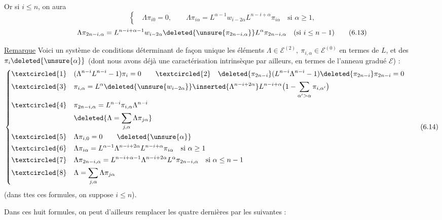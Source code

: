 Or si $i\leq n$, on aura
\[
\left\{\quad\Lambda\pi_{i0}=0,\qquad\Lambda\pi_{i\alpha}=L^{\alpha-1}w_{i-2\alpha}L^{n-i+\alpha}\pi_{i\alpha}\quad\text{si }\alpha\geq1,\right.
\tag{6.12}
\]
\[
\Lambda\pi_{2n-i,\alpha}=L^{n-i+\alpha-1}w_{i-2\alpha}\deleted{\unsure{\pi_{2n-i,\alpha}}}L^\alpha\pi_{2n-i,\alpha}\quad(\text{si }i\leq n-1)
\tag{6.13}
\]

\uline{Remarque} Voici un système de conditions déterminant de façon unique les éléments $\Lambda\in\mathcal E^{(2)},\ \pi_{i,\alpha}\in\mathcal E^{(0)}$ en termes de $L$, et des $\pi_i\deleted{\unsure{\alpha}}$ (dont nous avons déjà une caractérisation intrinsèque par ailleurs, en termes de l'anneau gradué $\mathcal E$) :
\[
\left\{\begin{aligned}
\textcircled{1}\quad &(\Lambda^{n-i}L^{n-i}-1)\pi_i=0
\qquad\textcircled{2}\quad\deleted{\pi_{2n-i}}(L^{n-i}\Lambda^{n-i}-1)\deleted{\pi_{2n-i}}\pi_{2n-i}=0\\
\textcircled{3}\quad &\pi_{i,\alpha}=L^\alpha\deleted{\unsure{w_{i-2\alpha}}}\inserted{\Lambda^{n-i+2\alpha}}L^{n-i+\alpha}\bigl(1-\sum_{\alpha'>\alpha}\pi_{i,\alpha'}\bigr)\\
\textcircled{4}\quad &\pi_{2n-i,\alpha}=L^{n-i}\pi_{i,\alpha}\Lambda^{n-i}\\
&\deleted{\Lambda=\sum_{j,\alpha}\Lambda\pi_{j\alpha}}\\
\textcircled{5}\quad &\Lambda\pi_{i,0}=0\qquad\deleted{\unsure{\alpha}}\\
\textcircled{6}\quad &\Lambda\pi_{i\alpha}=L^{\alpha-1}\Lambda^{n-i+2\alpha}L^{n-i+\alpha}\pi_{i\alpha}\quad\text{si }\alpha\geq1\\
\textcircled{7}\quad &\Lambda\pi_{2n-i,\alpha}=L^{n-i+\alpha-1}\Lambda^{n-i+2\alpha}L^\alpha\pi_{2n-i,\alpha}\quad\text{si }\alpha\leq n-1\\
\textcircled{8}\quad &\Lambda=\sum_{j,\alpha}\Lambda\pi_{j\alpha}
\end{aligned}\right.
\tag{6.14}
\]
(dans ttes ces formules, on suppose $i\leq n$).

Dans ces huit formules, on peut d'ailleurs remplacer les quatre dernières par les suivantes  :
